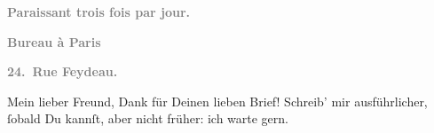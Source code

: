 \pstart
           \begin{otherlanguage}{french}\textcolor{gray}{\textbf{\textbf{Paraissant trois fois par jour.}}}\end{otherlanguage}\pend
           
\pstart
           \begin{otherlanguage}{french}\textcolor{gray}{\textbf{\textbf{Bureau à Paris}}}\end{otherlanguage}\pend
           
\pstart
           \begin{otherlanguage}{french}\textcolor{gray}{\textbf{\textbf{24. Rue Feydeau.}}}\end{otherlanguage}\pend
           
\pstart\center{}Mein lieber Freund,\pend\vspace{0.5em}
\pstart
           Dank für Deinen lieben Brief! Schreib’ mir ausführlicher,{ }ſobald Du kannſt, aber
               nicht früher: ich warte gern.\pend
           
